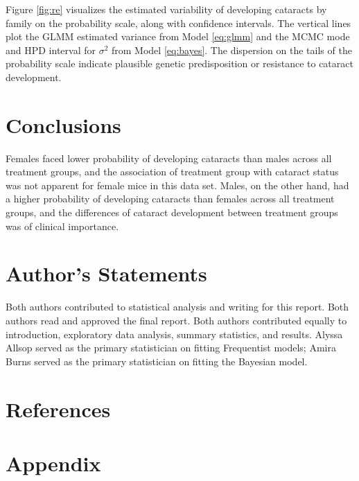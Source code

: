 \documentclass[12pt]{article}
\newlength{\cslhangindent}
\newlength{\cslentryspacingunit} %
\newenvironment{CSLReferences}[2] %
 {%
  \setlength{\parindent}{0pt}
  \ifodd #1
  \let\oldpar\par
  \def\par{\hangindent=\cslhangindent\oldpar}
  \fi
  \setlength{\parskip}{#2\cslentryspacingunit}
 }%
 {}
\begin{document}
Figure \ref{fig:re} visualizes the estimated variability of developing cataracts by family on the probability scale, along with confidence intervals. The vertical lines plot the GLMM estimated variance from Model \eqref{eq:glmm} and the MCMC mode and HPD interval for \(\sigma^2\) from Model \eqref{eq:bayes}. The dispersion on the tails of the probability scale indicate plausible genetic predisposition or resistance to cataract development.

\section{Conclusions}
\label{sec:conc}

Females faced lower probability of developing cataracts than males across all treatment groups, and the association of treatment group with cataract status was not apparent for female mice in this data set. Males, on the other hand, had a higher probability of developing cataracts than females across all treatment groups, and the differences of cataract development between treatment groups was of clinical importance.

\section{Author's Statements}
\label{sec:auth}

Both authors contributed to statistical analysis and writing for this report. Both authors read and approved the final report. Both authors contributed equally to introduction, exploratory data analysis, summary statistics, and results. Alyssa Allsop served as the primary statistician on fitting Frequentist models; Amira Burns served as the primary statistician on fitting the Bayesian model.

\newpage

\hypertarget{references}{%
\section{References}\label{references}}

\hypertarget{refs}{}
\begin{CSLReferences}{0}{0}
\end{CSLReferences}

\appendix

\section{Appendix}
\end{document}
